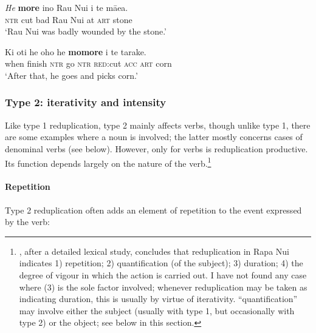 \ea\label{ex:2.19}
\gll \textit{He} \textbf{more} {\ꞌ}ino Rau Nui {\ꞌ}i te mā{\ꞌ}ea.\\
\textsc{ntr} cut bad Rau Nui at \textsc{art} stone\\

\glt 
‘Rau Nui was badly wounded by the stone.’ \textstyleExampleref{[Fel-64.081]}
\z

\ea\label{ex:2.20}
\gll Ki oti he oho he \textbf{momore} i te tarake. \\
when finish \textsc{ntr} go \textsc{ntr} \textsc{red}:cut \textsc{acc} \textsc{art} corn \\

\glt 
‘After that, he goes and picks corn.’ \textstyleExampleref{[R156.013]} 
\z

\subsubsection[Type 2: iterativity and intensity]{Type 2: iterativity and intensity}\label{sec:2.6.2.2}
Like type 1 reduplication, type 2 mainly affects verbs, though unlike type 1, there are some examples where a noun is involved; the latter mostly concerns cases of denominal verbs (see below). However, only for verbs is reduplication productive. Its function depends largely on the nature of the verb.\footnote{\label{fn:83}\citet{Johnston1978}, after a detailed lexical study, concludes that reduplication in Rapa Nui indicates 1) repetition; 2) quantification (of the subject); 3) duration; 4) the degree of vigour in which the action is carried out. I have not found any case where (3) is the sole factor involved; whenever reduplication may be taken as indicating duration, this is usually by virtue of iterativity. “quantification” may involve either the subject (usually with type 1, but occasionally with type 2) or the object; see below in this section.}

\paragraph{Repetition}\label{sec:2.6.2.2.1} Type 2 reduplication often adds an element of repetition to the event expressed by the verb:


